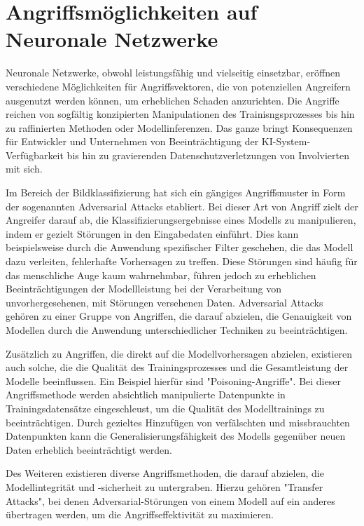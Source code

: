 \section{Angriffsmöglichkeiten auf Neuronale Netzwerke} \label{chpt:Stand_der_Technik_Angriffe}
Neuronale Netzwerke, obwohl leistungsfähig und vielseitig einsetzbar, eröffnen verschiedene Möglichkeiten für Angriffsvektoren, die von potenziellen Angreifern ausgenutzt werden können, um erheblichen Schaden anzurichten. Die Angriffe reichen von sogfältig konzipierten Manipulationen des Trainisngsprozesses bis hin zu raffinierten Methoden oder Modellinferenzen. Das ganze bringt  Konsequenzen für Entwickler und Unternehmen von Beeinträchtigung der KI-System-Verfügbarkeit bis hin zu gravierenden Datenschutzverletzungen von Involvierten mit sich.

Im Bereich der Bildklassifizierung hat sich ein gängiges Angriffsmuster in Form der sogenannten \glqq Adversarial Attacks\grqq{} etabliert. Bei dieser Art von Angriff zielt der Angreifer darauf ab, die Klassifizierungsergebnisse eines Modells zu manipulieren, indem er gezielt Störungen in den Eingabedaten einführt. Dies kann beispielsweise durch die Anwendung spezifischer Filter geschehen, die das Modell dazu verleiten, fehlerhafte Vorhersagen zu treffen. Diese Störungen sind häufig für das menschliche Auge kaum wahrnehmbar, führen jedoch zu erheblichen Beeinträchtigungen der Modellleistung bei der Verarbeitung von unvorhergesehenen, mit Störungen versehenen Daten. Adversarial Attacks gehören zu einer Gruppe von Angriffen, die darauf abzielen, die Genauigkeit von Modellen durch die Anwendung unterschiedlicher Techniken zu beeinträchtigen.

Zusätzlich zu Angriffen, die direkt auf die Modellvorhersagen abzielen, existieren auch solche, die die Qualität des Trainingsprozesses und die Gesamtleistung der Modelle beeinflussen. Ein Beispiel hierfür sind "Poisoning-Angriffe". Bei dieser Angriffsmethode werden absichtlich manipulierte Datenpunkte in Trainingsdatensätze eingeschleust, um die Qualität des Modelltrainings zu beeinträchtigen. Durch gezieltes Hinzufügen von verfälschten und missbrauchten Datenpunkten kann die Generalisierungsfähigkeit des Modells gegenüber neuen Daten erheblich beeinträchtigt werden.

Des Weiteren existieren diverse Angriffsmethoden, die darauf abzielen, die Modellintegrität und -sicherheit zu untergraben. Hierzu gehören "Transfer Attacks", bei denen Adversarial-Störungen von einem Modell auf ein anderes übertragen werden, um die Angriffseffektivität zu maximieren.

